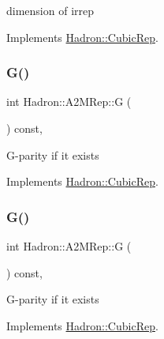 dimension of irrep 

Implements \mbox{\hyperlink{structHadron_1_1CubicRep_ac178d14064f037a66af4b9fb4b312d51}{Hadron\+::\+Cubic\+Rep}}.

\mbox{\label{structHadron_1_1A2MRep_a2850984bf027d7ac1b39ce7ff94c6d00}} 
\subsubsection{\texorpdfstring{G()}{G()}\hspace{0.1cm}{\footnotesize\ttfamily [1/2]}}
{\footnotesize\ttfamily int Hadron\+::\+A2\+M\+Rep\+::G (\begin{DoxyParamCaption}{ }\end{DoxyParamCaption}) const\hspace{0.3cm}{\ttfamily [inline]}, {\ttfamily [virtual]}}

G-\/parity if it exists 

Implements \mbox{\hyperlink{structHadron_1_1CubicRep_a52104e43266d1614c00bbd1c3b395458}{Hadron\+::\+Cubic\+Rep}}.

\mbox{\label{structHadron_1_1A2MRep_a2850984bf027d7ac1b39ce7ff94c6d00}} 
\subsubsection{\texorpdfstring{G()}{G()}\hspace{0.1cm}{\footnotesize\ttfamily [2/2]}}
{\footnotesize\ttfamily int Hadron\+::\+A2\+M\+Rep\+::G (\begin{DoxyParamCaption}{ }\end{DoxyParamCaption}) const\hspace{0.3cm}{\ttfamily [inline]}, {\ttfamily [virtual]}}

G-\/parity if it exists 

Implements \mbox{\hyperlink{structHadron_1_1CubicRep_a52104e43266d1614c00bbd1c3b395458}{Hadron\+::\+Cubic\+Rep}}.

\mbox{\label{structHadron_1_1A2MRep_acc01c7c94d15b610d4366faa2bc3afaf}} 
